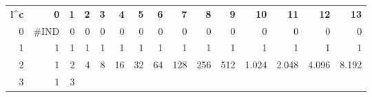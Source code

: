 \begin{table}[]
	\begin{tabular}{rrrrrrrrrrrrrrr}
		\rowcolor[HTML]{4472C4} 
		{\color[HTML]{FFFFFF} \textbf{l\textasciicircum{}c}} &
		{\color[HTML]{FFFFFF} \textbf{0}} &
		{\color[HTML]{FFFFFF} \textbf{1}} &
		{\color[HTML]{FFFFFF} \textbf{2}} &
		{\color[HTML]{FFFFFF} \textbf{3}} &
		{\color[HTML]{FFFFFF} \textbf{4}} &
		{\color[HTML]{FFFFFF} \textbf{5}} &
		{\color[HTML]{FFFFFF} \textbf{6}} &
		{\color[HTML]{FFFFFF} \textbf{7}} &
		{\color[HTML]{FFFFFF} \textbf{8}} &
		{\color[HTML]{FFFFFF} \textbf{9}} &
		{\color[HTML]{FFFFFF} \textbf{10}} &
		{\color[HTML]{FFFFFF} \textbf{11}} &
		{\color[HTML]{FFFFFF} \textbf{12}} &
		{\color[HTML]{FFFFFF} \textbf{13}} \\
		\rowcolor[HTML]{D9E1F2} 
		{\color[HTML]{000000} 0} &
		{\color[HTML]{000000} \#IND} &
		{\color[HTML]{000000} 0} &
		{\color[HTML]{000000} 0} &
		{\color[HTML]{000000} 0} &
		{\color[HTML]{000000} 0} &
		{\color[HTML]{000000} 0} &
		{\color[HTML]{000000} 0} &
		{\color[HTML]{000000} 0} &
		{\color[HTML]{000000} 0} &
		{\color[HTML]{000000} 0} &
		{\color[HTML]{000000} 0} &
		{\color[HTML]{000000} 0} &
		{\color[HTML]{000000} 0} &
		{\color[HTML]{000000} 0} \\
		{\color[HTML]{000000} 1} &
		{\color[HTML]{000000} 1} &
		{\color[HTML]{000000} 1} &
		{\color[HTML]{000000} 1} &
		{\color[HTML]{000000} 1} &
		{\color[HTML]{000000} 1} &
		{\color[HTML]{000000} 1} &
		{\color[HTML]{000000} 1} &
		{\color[HTML]{000000} 1} &
		{\color[HTML]{000000} 1} &
		{\color[HTML]{000000} 1} &
		{\color[HTML]{000000} 1} &
		{\color[HTML]{000000} 1} &
		{\color[HTML]{000000} 1} &
		{\color[HTML]{000000} 1} \\
		\rowcolor[HTML]{D9E1F2} 
		{\color[HTML]{000000} 2} &
		{\color[HTML]{000000} 1} &
		{\color[HTML]{000000} 2} &
		{\color[HTML]{000000} 4} &
		{\color[HTML]{000000} 8} &
		{\color[HTML]{000000} 16} &
		{\color[HTML]{000000} 32} &
		{\color[HTML]{000000} 64} &
		{\color[HTML]{000000} 128} &
		{\color[HTML]{000000} 256} &
		{\color[HTML]{000000} 512} &
		{\color[HTML]{000000} 1.024} &
		{\color[HTML]{000000} 2.048} &
		{\color[HTML]{000000} 4.096} &
		{\color[HTML]{000000} 8.192} \\
		{\color[HTML]{000000} 3} &
		{\color[HTML]{000000} 1} &
		{\color[HTML]{000000} 3} &

\end{tabular}
\end{table}
